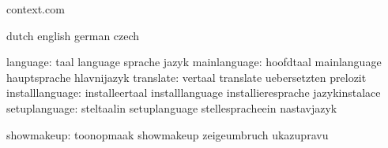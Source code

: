 


\startlogginginterface context.com



\startcommands                  dutch                        english
                                german                       czech

                     language:  taal                         language
                                sprache                      jazyk
                 mainlanguage:  hoofdtaal                    mainlanguage
                                hauptsprache                 hlavnijazyk
                    translate:  vertaal                      translate
                                uebersetzten                 prelozit
              installlanguage:  installeertaal               installlanguage
                                installieresprache           jazykinstalace
                setuplanguage:  steltaalin                   setuplanguage
                                stellespracheein             nastavjazyk

                   showmakeup:  toonopmaak                   showmakeup
                                zeigeumbruch                 ukazupravu

